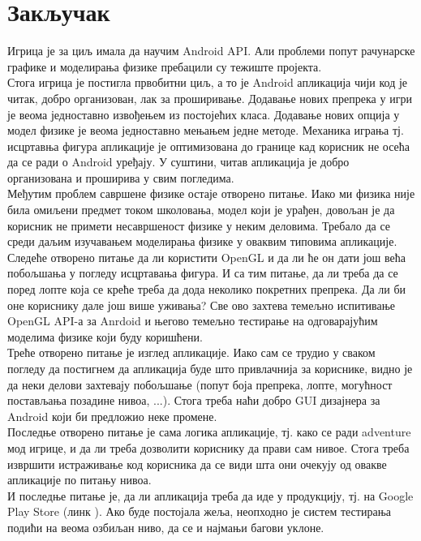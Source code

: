 \chapter{Закључак} \label{Conclusion}

Игрица је за циљ имала да научим Android API. Али проблеми попут рачунарске графике и моделирања физике пребацили су тежиште пројекта.  
\\ \indent Стога игрица је постигла првобитни циљ, а то је Android апликација чији код је читак, добро организован, лак за проширивање. Додавање нових препрека у игри је веома једноставно извођењем из постојећих класа. Додавање нових опција у модел физике је веома једноставно мењањем једне методе. Механика играња тј. исцртавња фигура апликације је оптимизована до границе кад корисник не осећа да се ради о Android уређају. У суштини, читав апликација је добро организована и проширива у свим погледима. 
\\ \indent Међутим проблем савршене физике остаје отворено питање. Иако ми физика није била омиљени предмет током школовања, модел који је урађен, довољан је да корисник не примети несавршеност физике у неким деловима. Требало да се среди даљим изучавањем моделирања физике у оваквим типовима апликације. 
\\ \indent Следеће отворено питање да ли користити OpenGL и да ли ће он дати још већа побољшања у погледу исцртавања фигура. И са тим питање, да ли треба да се поред лопте која се креће треба да дода неколико покретних препрека. Да ли би оне кориснику дале још више уживања? Све ово захтева темељно испитивање OpenGL API-а за Anrdoid и његово темељно тестирање на одговарајућим моделима физике који буду коришћени.
\\ \indent Треће отворено питање је изглед апликације. Иако сам се трудио у сваком погледу да постигнем да апликација буде што привлачнија за кориснике, видно је да неки делови захтевају побољшање (попут боја препрека, лопте, могућност постављања позадине нивоа, ...).  Стога треба наћи добро GUI дизајнера за Android који би предложио неке промене. 
\\ \indent Последње отворено питање је сама логика апликације, тј. како се ради adventure мод игрице, и да ли треба дозволити кориснику да прави сам нивое. Стога треба извршити истраживање код корисника да се види шта они очекују од овакве апликације по питању нивоа.
\\ \indent И последње питање је, да ли апликација треба да иде у продукцију, тј. на Google Play Store (линк ). Ако буде постојала жеља, неопходно је систем тестирања подићи на веома озбиљан ниво, да се и најмањи багови уклоне.